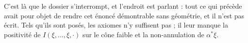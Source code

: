 \documentclass[11pt,a4paper]{article}
\begin{document}
C'est là que le dossier s'interrompt, et l'endroit est parlant : tout ce qui
précède avait pour objet de rendre cet énoncé démontrable sans géométrie, et il
n'est pas écrit. Tels qu'ils sont posés, les axiomes n'y suffisent pas ; il
leur manque la positivité de $I(\xi, \ldots, \xi, \cdot)$ sur le cône faible
et la non-annulation de $\alpha^{*}\xi$.
\end{document}
